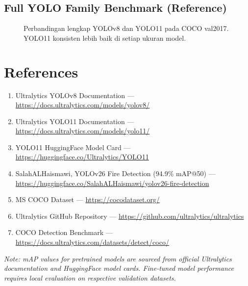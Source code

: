 \documentclass[12pt,a4paper]{article}
\begin{document}
\subsection{Full YOLO Family Benchmark (Reference)}

\begin{figure}[H]
\centering
{}
\caption{Perbandingan lengkap YOLOv8 dan YOLO11 pada COCO val2017. YOLO11 konsisten lebih baik di setiap ukuran model.}
\end{figure}

\section{References}

\begin{enumerate}
    \item Ultralytics YOLOv8 Documentation — \url{https://docs.ultralytics.com/models/yolov8/}
    \item Ultralytics YOLO11 Documentation — \url{https://docs.ultralytics.com/models/yolo11/}
    \item YOLO11 HuggingFace Model Card — \url{https://huggingface.co/Ultralytics/YOLO11}
    \item SalahALHaismawi, YOLOv26 Fire Detection (94.9\% mAP@50) — \url{https://huggingface.co/SalahALHaismawi/yolov26-fire-detection}
    \item MS COCO Dataset — \url{https://cocodataset.org/}
    \item Ultralytics GitHub Repository — \url{https://github.com/ultralytics/ultralytics}
    \item COCO Detection Benchmark — \url{https://docs.ultralytics.com/datasets/detect/coco/}
\end{enumerate}

\vspace{2em}
\noindent\textit{Note: mAP values for pretrained models are sourced from official Ultralytics documentation and HuggingFace model cards. Fine-tuned model performance requires local evaluation on respective validation datasets.}
\end{document}
